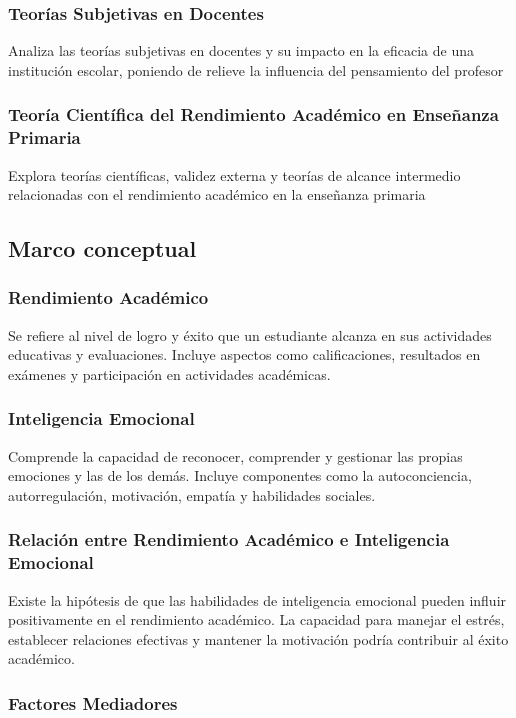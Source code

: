 \documentclass[12pt]{article}
\begin{document}
\subsubsection*{Teorías Subjetivas en Docentes} Analiza las teorías subjetivas en docentes y su impacto en la eficacia de una institución escolar, poniendo de relieve la influencia del pensamiento del profesor %

\subsubsection*{Teoría Científica del Rendimiento Académico en Enseñanza Primaria} Explora teorías científicas, validez externa y teorías de alcance intermedio relacionadas con el rendimiento académico en la enseñanza primaria %
\subsection{Marco conceptual }%
\subsubsection*{Rendimiento Académico}

Se refiere al nivel de logro y éxito que un estudiante alcanza en sus actividades educativas y evaluaciones.
Incluye aspectos como calificaciones, resultados en exámenes y participación en actividades académicas.
\subsubsection*{Inteligencia Emocional}

Comprende la capacidad de reconocer, comprender y gestionar las propias emociones y las de los demás.
Incluye componentes como la autoconciencia, autorregulación, motivación, empatía y habilidades sociales.
\subsubsection*{Relación entre Rendimiento Académico e Inteligencia Emocional}

Existe la hipótesis de que las habilidades de inteligencia emocional pueden influir positivamente en el rendimiento académico.
La capacidad para manejar el estrés, establecer relaciones efectivas y mantener la motivación podría contribuir al éxito académico.
\subsubsection*{Factores Mediadores}
\end{document}
